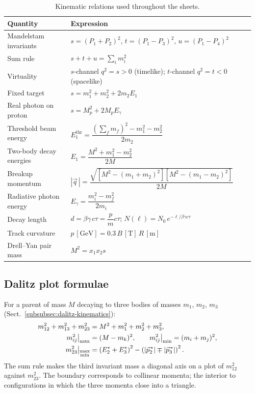 \begin{table}[htbp]
    \centering
    \caption{Kinematic relations used throughout the sheets.}
    \label{tab:kinematics}
    \renewcommand{\arraystretch}{1.5}
    \begin{tabular}{ll}
        \hline
        Quantity & Expression \\
        \hline
        Mandelstam invariants
            & $s=(P_1+P_2)^2$, $t=(P_1-P_3)^2$, $u=(P_1-P_4)^2$ \\
        Sum rule
            & $s+t+u=\sum_i m_i^2$ \\
        Virtuality
            & $s$-channel $q^2=s>0$ (timelike); $t$-channel $q^2=t<0$ (spacelike) \\
        Fixed target
            & $s = m_1^2 + m_2^2 + 2 m_2 E_1$ \\
        Real photon on proton
            & $s = M_p^2 + 2 M_p E_\gamma$ \\
        Threshold beam energy
            & $E_1^{\mathrm{thr}} = \dfrac{\left(\sum_f m_f\right)^2 - m_1^2 - m_2^2}{2m_2}$ \\
        Two-body decay energies
            & $E_1 = \dfrac{M^2+m_1^2-m_2^2}{2M}$ \\
        Breakup momentum
            & $|\vec q\,| = \dfrac{\sqrt{[M^2-(m_1+m_2)^2][M^2-(m_1-m_2)^2]}}{2M}$ \\
        Radiative photon energy
            & $E_\gamma = \dfrac{m_i^2-m_f^2}{2m_i}$ \\
        Decay length
            & $d = \beta\gamma\, c\tau = \dfrac{p}{m}c\tau$;\quad
              $N(\ell)=N_0\,e^{-\ell/\beta\gamma c\tau}$ \\
        Track curvature
            & $p\,[\mathrm{GeV}] = 0.3\, B\,[\mathrm{T}]\, R\,[\mathrm{m}]$ \\
        Drell--Yan pair mass
            & $M^2 = x_1 x_2 s$ \\
        \hline
    \end{tabular}
\end{table}

\subsection{Dalitz plot formulae}
\label{app:dalitz-formulae}

For a parent of mass $M$ decaying to three bodies of masses $m_1$, $m_2$, $m_3$
(Sect.~\ref{subsubsec:dalitz-kinematics}):
\begin{align}
    m_{12}^2 + m_{13}^2 + m_{23}^2 &= M^2 + m_1^2 + m_2^2 + m_3^2, \notag\\
    m_{ij}^2\big|_{\max} &= (M-m_k)^2, \qquad
    m_{ij}^2\big|_{\min} = (m_i+m_j)^2, \notag\\
    m_{23}^2\big|_{\substack{\max\\\min}}
    &= \left(E_2^*+E_3^*\right)^2
       - \left(|\vec p_2^{\,*}| \mp |\vec p_3^{\,*}|\right)^2 .
\end{align}
The sum rule makes the third invariant mass a diagonal axis on a plot of $m_{12}^2$
against $m_{23}^2$. The boundary corresponds to collinear momenta; the interior to
configurations in which the three momenta close into a triangle.

